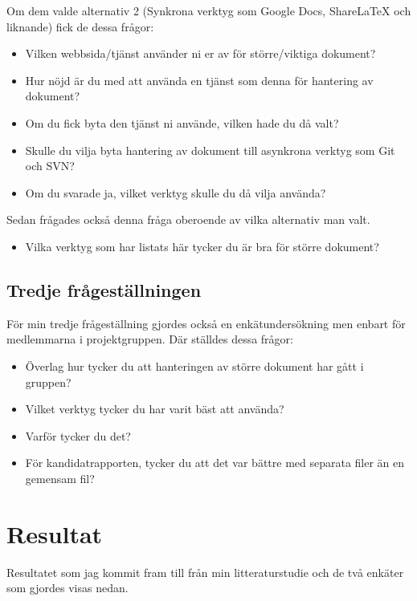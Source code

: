 Om dem valde alternativ 2 (Synkrona verktyg som Google Docs, ShareLaTeX och liknande) fick de dessa frågor:

\begin{itemize}
	\item Vilken webbsida/tjänst använder ni er av för större/viktiga dokument?
	\item Hur nöjd är du med att använda en tjänst som denna för hantering av dokument?
	\item Om du fick byta den tjänst ni använde, vilken hade du då valt?
	\item Skulle du vilja byta hantering av dokument till asynkrona verktyg som Git och SVN?
	\item Om du svarade ja, vilket verktyg skulle du då vilja använda?
\end{itemize}

Sedan frågades också denna fråga oberoende av vilka alternativ man valt.
\begin{itemize}
	\item Vilka verktyg som har listats här tycker du är bra för större dokument?
\end{itemize}

\subsection{Tredje frågeställningen}

För min tredje frågeställning gjordes också en enkätundersökning men enbart för medlemmarna i projektgruppen. Där ställdes dessa frågor:
\begin{itemize}
	\item Överlag hur tycker du att hanteringen av större dokument har gått i gruppen?
	\item Vilket verktyg tycker du har varit bäst att använda?
	\item Varför tycker du det?
	\item För kandidatrapporten, tycker du att det var bättre med separata filer än en gemensam fil?
\end{itemize}

\section{Resultat}
\label{sec:results-tuhkala}
Resultatet som jag kommit fram till från min litteraturstudie och de två enkäter som gjordes visas nedan.

